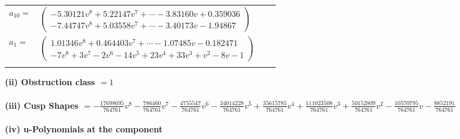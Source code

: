 \documentclass[1p]{elsarticle_modified}
\theoremstyle{definition}
\begin{document}
\begin{tabular}{m{7pt} m{180pt} m{7pt} m{180pt} }
\flushright $a_{10}=$&$\begin{pmatrix}-5.30121 v^{8}+5.22147 v^{7}+\cdots-3.83160 v+0.359036\\-7.44747 v^{8}+5.03558 v^{7}+\cdots-3.40173 v-1.94867\end{pmatrix}$ \\
\flushright $a_{1}=$&$\begin{pmatrix}1.01346 v^{8}+0.464403 v^{7}+\cdots-1.07485 v-0.182471\\-7 v^8+3 v^7-2 v^6-14 v^5+23 v^4+33 v^3+v^2-8 v-1\end{pmatrix}$\\&\end{tabular}
\flushleft \textbf{(ii) Obstruction class $= 1$}\\~\\
\flushleft \textbf{(iii) Cusp Shapes $= -\frac{17698695}{764761} v^8-\frac{786460}{764761} v^7-\frac{4755547}{764761} v^6-\frac{34014228}{764761} v^5+\frac{35615785}{764761} v^4+\frac{111023508}{764761} v^3+\frac{50152809}{764761} v^2-\frac{10570795}{764761} v-\frac{8852191}{764761}$}\\~\\
\newpage\renewcommand{\arraystretch}{1}
\flushleft \textbf{(iv) u-Polynomials at the component}\newline \\
\end{document}
